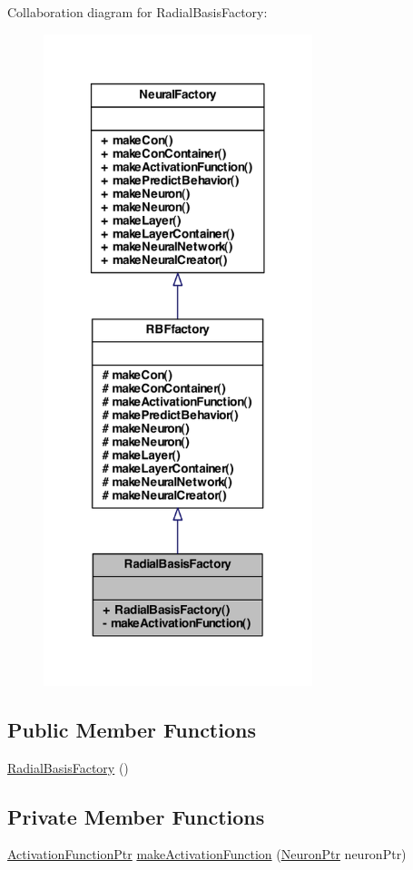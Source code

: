 Collaboration diagram for RadialBasisFactory:
\nopagebreak
\begin{figure}[H]
\begin{center}
\leavevmode
\includegraphics[width=222pt]{class_radial_basis_factory__coll__graph}
\end{center}
\end{figure}
\subsection*{Public Member Functions}
\begin{DoxyCompactItemize}
\item 
\hyperlink{class_radial_basis_factory_a0c6b19106a36a0d9155e88701c982630}{RadialBasisFactory} ()
\end{DoxyCompactItemize}
\subsection*{Private Member Functions}
\begin{DoxyCompactItemize}
\item 
\hyperlink{_a_m_o_r_e_8h_a77602a0277a02e5769c3df0adc669b17}{ActivationFunctionPtr} \hyperlink{class_radial_basis_factory_ae68ec682e8f04e99e5a1560e347b7735}{makeActivationFunction} (\hyperlink{_a_m_o_r_e_8h_ac1ea936c2c7728eb382278131652fef4}{NeuronPtr} neuronPtr)
\end{DoxyCompactItemize}


